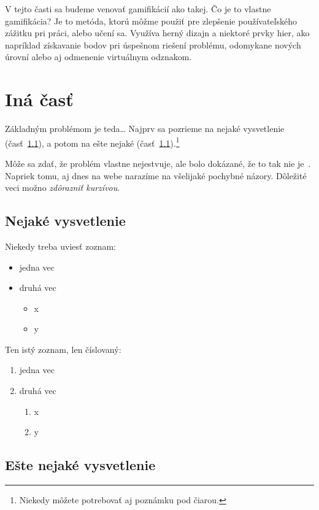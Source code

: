 \documentclass[10pt,twoside,slovak,a4paper]{article}
\begin{document}
V tejto časti sa budeme venovať gamifikácií ako takej. Čo je to vlastne gamifikácia? Je to metóda, ktorú môžme použiť pre zlepšenie používateľského zážitku pri práci, alebo učení sa. Využíva herný dizajn a niektoré prvky hier, ako napríklad získavanie bodov pri úspešnom riešení problému, odomykane nových úrovní alebo aj odmenenie virtuálnym odznakom.


\section{Iná časť} \label{ina}

Základným problémom je teda\ldots{} Najprv sa pozrieme na nejaké vysvetlenie (časť~\ref{ina:nejake}), a potom na ešte nejaké (časť~\ref{ina:nejake}).\footnote{Niekedy môžete potrebovať aj poznámku pod čiarou.}

Môže sa zdať, že problém vlastne nejestvuje\cite{Coplien:MPD}, ale bolo dokázané, že to tak nie je~\cite{Czarnecki:Staged, Czarnecki:Progress}. Napriek tomu, aj dnes na webe narazíme na všelijaké pochybné názory\cite{PLP-Framework}. Dôležité veci možno \emph{zdôrazniť kurzívou}.


\subsection{Nejaké vysvetlenie} \label{ina:nejake}

Niekedy treba uviesť zoznam:

\begin{itemize}
\item jedna vec
\item druhá vec
	\begin{itemize}
	\item x
	\item y
	\end{itemize}
\end{itemize}

Ten istý zoznam, len číslovaný:

\begin{enumerate}
\item jedna vec
\item druhá vec
	\begin{enumerate}
	\item x
	\item y
	\end{enumerate}
\end{enumerate}


\subsection{Ešte nejaké vysvetlenie} \label{ina:este}
\end{document}
